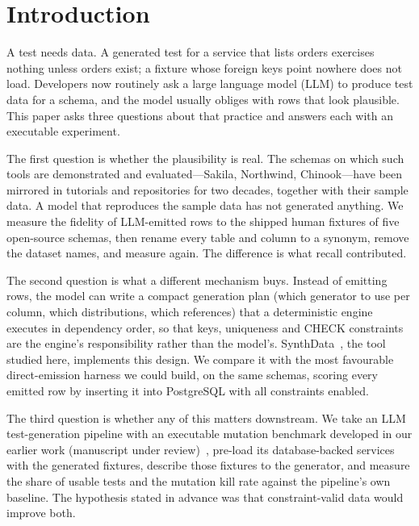 \documentclass[preprint,12pt]{elsarticle}
\begin{document}
\linenumbers

\section{Introduction}
\label{sec:intro}

A test needs data. A generated test for a service that lists orders exercises nothing unless orders exist; a fixture whose foreign keys point nowhere does not load. Developers now routinely ask a large language model (LLM) to produce test data for a schema, and the model usually obliges with rows that look plausible. This paper asks three questions about that practice and answers each with an executable experiment.

The first question is whether the plausibility is real. The schemas on which such tools are demonstrated and evaluated---Sakila, Northwind, Chinook---have been mirrored in tutorials and repositories for two decades, together with their sample data. A model that reproduces the sample data has not generated anything. We measure the fidelity of LLM-emitted rows to the shipped human fixtures of five open-source schemas, then rename every table and column to a synonym, remove the dataset names, and measure again. The difference is what recall contributed.

The second question is what a different mechanism buys. Instead of emitting rows, the model can write a compact generation plan (which generator to use per column, which distributions, which references) that a deterministic engine executes in dependency order, so that keys, uniqueness and CHECK constraints are the engine's responsibility rather than the model's. SynthData~\cite{synthdata}, the tool studied here, implements this design. We compare it with the most favourable direct-emission harness we could build, on the same schemas, scoring every emitted row by inserting it into PostgreSQL with all constraints enabled.

The third question is whether any of this matters downstream. We take an LLM test-generation pipeline with an executable mutation benchmark developed in our earlier work (manuscript under review)~\cite{javvadi2026raitg}, pre-load its database-backed services with the generated fixtures, describe those fixtures to the generator, and measure the share of usable tests and the mutation kill rate against the pipeline's own baseline. The hypothesis stated in advance was that constraint-valid data would improve both.
\end{document}
